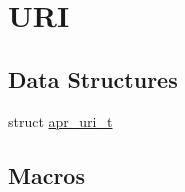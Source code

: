 \hypertarget{group___a_p_r___util___u_r_i}{\section{U\-R\-I}
\label{group___a_p_r___util___u_r_i}
}
\subsection*{Data Structures}
\begin{DoxyCompactItemize}
\item 
struct \hyperlink{structapr__uri__t}{apr\-\_\-uri\-\_\-t}
\end{DoxyCompactItemize}
\subsection*{Macros}
